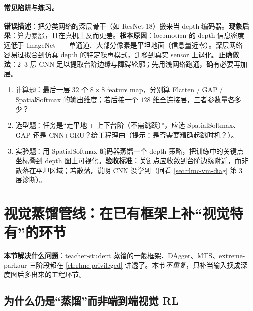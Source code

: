 \paragraph{常见陷阱与练习。}

\begin{pitfall}
\textbf{错误描述}：把分类网络的深层骨干（如 ResNet-18）搬来当 depth 编码器。\textbf{现象后果}：算力暴涨，且在真机上反而更差。\textbf{根本原因}：locomotion 的 depth 信息密度远低于 ImageNet——单通道、大部分像素是平坦地面（信息量近零）。深层网络容易过拟合到仿真 depth 的特定噪声模式，迁移到真实 sensor 上退化。\textbf{正确做法}：$2$--$3$ 层 CNN 足以提取台阶边缘与障碍轮廓；先用浅网络跑通，确有必要再加层。
\end{pitfall}

\begin{practice}[选型与可视化]
\begin{enumerate}
\item 计算题：最后一层 $32$ 个 $8\times8$ feature map，分别算 Flatten / GAP / SpatialSoftmax 的输出维度；若后接一个 $128$ 维全连接层，三者参数量各多少？
\item 选型题：任务是“走平地 + 上下台阶（不需跳跃）”，应选 SpatialSoftmax、GAP 还是 CNN+GRU？给工程理由（提示：是否需要精确起跳时机？）。
\item 实验题：用 SpatialSoftmax 编码器蒸馏一个 depth 策略，把训练中的关键点坐标叠到 depth 图上可视化。\textbf{验收标准}：关键点应收敛到台阶边缘附近，而非散落在平坦区域；若散落，说明 CNN 没学到（回看 \cref{sec:rlmc-vm-diag} 第 3 层诊断）。
\end{enumerate}
\end{practice}

\section{视觉蒸馏管线：在已有框架上补“视觉特有”的环节}
\label{sec:rlmc-vm-distill}

\textbf{本节解决什么问题}：teacher-student 蒸馏的一般框架、DAgger、MTS、extreme-parkour 三阶段都在 \cref{ch:rlmc-privileged} 讲透了。本节\emph{不重复}，只补当输入换成深度图后多出来的工程环节。

\subsection{为什么仍是“蒸馏”而非端到端视觉 RL}
\label{sec:rlmc-vm-whydistill}

